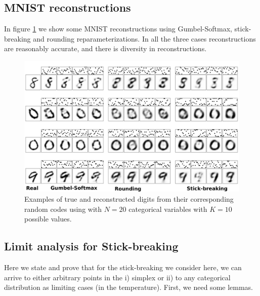\documentclass[twoside]{article}
\begin{document}
\subsection*{MNIST reconstructions}
In figure \ref{fig:VAE} we show some MNIST  reconstructions using Gumbel-Softmax, stick-breaking and rounding reparameterizations. In all the three cases reconstructions are reasonably accurate, and there is diversity in reconstructions.
\begin{figure}[t]
  \centering
  \includegraphics[width=5.in]{../figures/figure4.pdf} 
  \caption{Examples of true and reconstructed digits from their corresponding random codes using with $N=20$ categorical variables with $K=10$ possible values.
  }
\label{fig:VAE}
\end{figure}

\subsection*{Limit analysis for Stick-breaking}

Here we state and prove that for  the stick-breaking we consider here, we can arrive to either arbitrary points in the i) simplex or ii) to any categorical distribution as limiting cases (in the temperature).  First, we need some lemmas.
\end{document}
